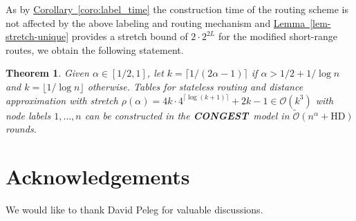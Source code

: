 \documentclass[letterpaper,11pt]{article}
\newcommand{\namedref}[2]{\hyperref[#2]{#1~\ref*{#2}}}
\newcommand{\lemmaref}[1]{\namedref{Lemma}{#1}}
\newcommand{\corollaryref}[1]{\namedref{Corollary}{#1}}
\newtheorem{theorem}{Theorem}[section]
\newcommand{\BO}{\mathcal{O}}
\newcommand{\CONGEST}{\textbf{CONGEST}}
\newcommand{\HD}{\mathrm{HD}}
\begin{document}
As by \corollaryref{coro:label_time} the construction time of the routing scheme 
is not affected by the above labeling and routing mechanism and
\lemmaref{lem-stretch-unique} provides a stretch bound of $2\cdot 2^{2L}$ for
the modified short-range routes, we obtain the following statement.
\begin{theorem}\label{theorem:routing-unique}
Given $\alpha\in [1/2,1]$, let $k=\lceil 1/(2\alpha-1)\rceil$ if
$\alpha>1/2+1/\log n$ and $k=\lfloor 1/\log n\rfloor$ otherwise. Tables for
stateless routing and distance approximation with stretch $\rho(\alpha)=4k\cdot
4^{\lceil\log (k+1)\rceil}+2k-1\in \BO(k^3)$ with node labels $1,\ldots,n$ can
be constructed in the \CONGEST\ model in $\tilde{\BO}(n^{\alpha}+\HD)$ rounds.
\end{theorem}

\section*{Acknowledgements}
We would like to thank David Peleg for valuable discussions.



\end{document}
